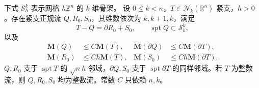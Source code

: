 \begin{proposition}\label{g3:prop:deformation-to-skeleton}
	下式 \(\mathcal S_h^k\) 表示网格 \(h\mathbb Z^n\) 的 \(k\) 维骨架。
	设 \(0\le k<n\)，\(T\in\mathcal N_k(\mathbb R^n)\) 紧支，\(h>0\)。存在紧支正规流 \(Q,R_0,S_0\)，其维数依次为 \(k,k+1,k\)，满足
	\[
	T-Q=\partial R_0+S_0,\qquad
	\operatorname{spt}Q\subset\mathcal S_h^k,
	\]
	以及
	\begin{equation}\label{g3:eq:skeleton-deformation-bounds}
	\begin{aligned}
	\mathbf M(Q)&\le C\mathbf M(T),&
	\mathbf M(\partial Q)&\le C\mathbf M(\partial T),\\
	\mathbf M(R_0)&\le Ch\mathbf M(T),&
	\mathbf M(S_0)&\le Ch\mathbf M(\partial T).
	\end{aligned}
	\end{equation}
	\(Q,R_0\) 支于 \(\operatorname{spt}T\) 的 \(\sqrt n h\) 邻域，\(\partial Q,S_0\) 支于 \(\operatorname{spt}\partial T\) 的同样邻域。若 \(T\) 为整数流，则 \(Q,R_0,S_0\) 均为整数流。常数 \(C\) 只依赖 \(n,k\)。
\end{proposition}
